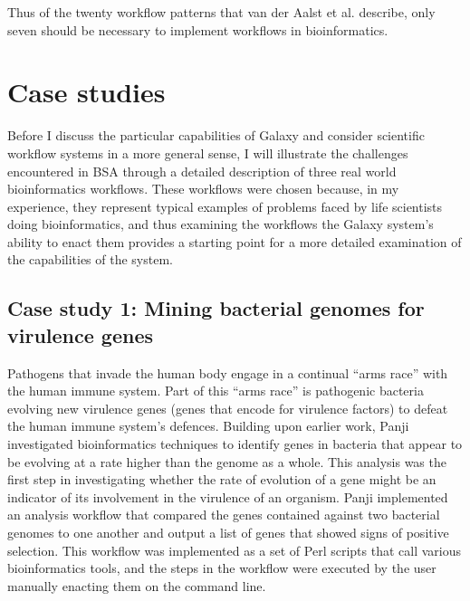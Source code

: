 \documentclass[a4paper,10pt]{scrreprt}
\begin{document}
Thus of the twenty workflow patterns that van der Aalst et al. describe, only seven should be necessary to implement workflows in bioinformatics.


\section{Case studies}

Before I discuss the particular capabilities of Galaxy and consider scientific workflow systems in a more general sense, I will illustrate the challenges encountered in \gls{BSA} through a detailed description of three real world bioinformatics workflows. These workflows were chosen because, in my experience, they represent typical examples of problems faced by life scientists doing bioinformatics, and thus examining the workflows the Galaxy system's ability to enact them provides a starting point for a more detailed examination of the capabilities of the system.

\subsection{Case study 1: Mining bacterial genomes for virulence genes}

Pathogens that invade the human body engage in a continual ``arms race'' with the human immune system. Part of this ``arms race'' is pathogenic bacteria evolving new virulence genes (genes that encode for virulence factors) to defeat the human immune system's defences. Building upon earlier work, Panji \cite{panji_identification_2009} investigated bioinformatics techniques to identify genes in bacteria that appear to be evolving at a rate higher than the genome as a whole. This analysis was the first step in investigating whether the rate of evolution of a gene might be an indicator of its involvement in the virulence of an organism. Panji implemented an analysis workflow that compared the genes contained against two bacterial genomes to one another and output a list of genes that showed signs of positive selection. This workflow was implemented as a set of Perl scripts that call various bioinformatics tools, and the steps in the workflow were executed by the user manually enacting them on the command line.
\end{document}

